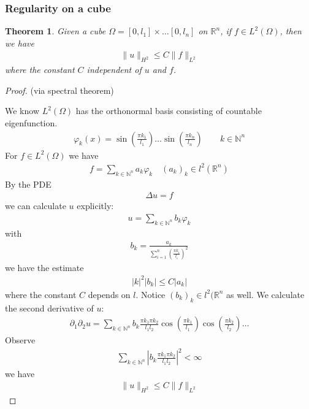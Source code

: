\documentclass[a4paper,11pt,oneside,fleqn]{book}
\newtheorem{theorem}{Theorem}[section]
\theoremstyle{definition}
\theoremstyle{remark}
\begin{document}
\subsubsection{Regularity on a cube}
\begin{theorem}
	Given a cube $ \Omega = [0, l_1] \times \dots [0, l_n]$ on $\mathbb{R}^n$, if $f \in L^2(\Omega)$, then we have
	\begin{align*}
		\|u\|_{H^2} \le C \|f\|_{L^2}
	\end{align*}
	where the constant $C$ independent of $u$ and $f$. 
\end{theorem}
\begin{proof}(via spectral theorem)\par 
We know $L^2(\Omega)$ has the orthonormal basis consisting of countable eigenfunction. 
\begin{align*}
	\varphi_k(x) = \sin(\frac{\pi k_1}{l_1}) \dots \sin (\frac{\pi k_n}{l_n}) \qquad k \in \mathbb{N}^n
\end{align*}
For $f \in L^2(\Omega)$ we have 
\begin{align*}
	f = \sum_{k \in \mathbb{N}^n} a_k \varphi_k  \quad (a_k)_k \in l^2(\mathbb{R}^n) 
\end{align*}
By the PDE
\begin{align*}
	\Delta u = f
\end{align*}
we can calculate $u$ explicitly:
\begin{align*}
	u = \sum_{k \in \mathbb{N}^n} b_k \varphi_k
\end{align*}
with 
\begin{align*}
	b_k = \frac{a_k}{\sum_{i = 1}^n (\frac{\pi k_i}{l_i})^2}
\end{align*}
we have the estimate 
\begin{align*}
	|k|^2|b_k| \le C |a_k|
\end{align*}
where the constant $C$ depends on $l$. Notice $(b_k)_k \in l^2(\mathbb{R}^n$ as well. We calculate the second derivative of $u$:
\begin{align*}
	\partial_1 \partial_2 u = \sum_{k \in \mathbb{N}^n} b_k \frac{\pi k_1 \pi k_2}{l_1 l_2} \cos(\frac{\pi k_1}{l_1}) \cos(\frac{\pi k_2}{l_2}) \dots
\end{align*} 
Observe
\begin{align*}
	\sum_{k \in \mathbb{N}^n}  |b_k \frac{\pi k_1 \pi k_2}{l_1 l_2}|^2 < \infty
\end{align*}
we have 
\begin{align*}
	\|u\|_{H^2} \le C \|f\|_{L^2}
\end{align*}
\end{proof}
\end{document}

